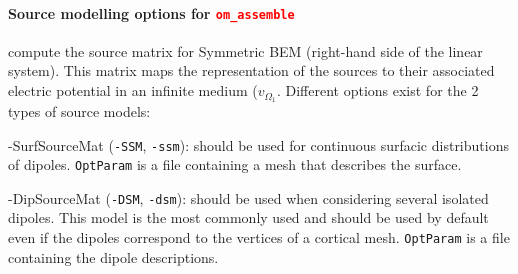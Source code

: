 \documentclass[10pt,journal]{book}
\newcommand{\commandName}[1]{\textcolor{red}{\tt #1}}
\newcommand{\optionName}[1]{\textcolor{OliveGreen}{\tt #1}}
\newcommand*\OptionsLabel[1]{\optionName{#1}}
\newenvironment{Options}{
    \begin{list}{}{
        \let\makelabel\OptionsLabel\setlength\labelwidth{30pt}%
        \setlength\leftmargin{\labelwidth+\labelsep}}}
    {\end{list}}
\begin{document}
        \paragraph*{Source modelling options for \commandName{om\_assemble}} compute the source matrix for Symmetric BEM (right-hand side of the linear system).
            This matrix maps the representation of the sources to their associated electric potential in an infinite medium ($v_{\Omega_1}$.
            Different options exist for the 2 types of source models:
            \begin{Options}
                \item[-SurfSourceMat] (\optionName{-SSM}, \optionName{-ssm}): should be used for continuous surfacic distributions of dipoles.
                        \optionName{OptParam} is a file containing a mesh that describes the surface.
                \item[-DipSourceMat] (\optionName{-DSM}, \optionName{-dsm}): should be used when considering several isolated dipoles. This model is the most commonly
                        used and should be used by default even if the dipoles correspond to the vertices of a cortical mesh.
                        \optionName{OptParam} is a file containing the dipole descriptions.

            \end{Options}
\end{document}
